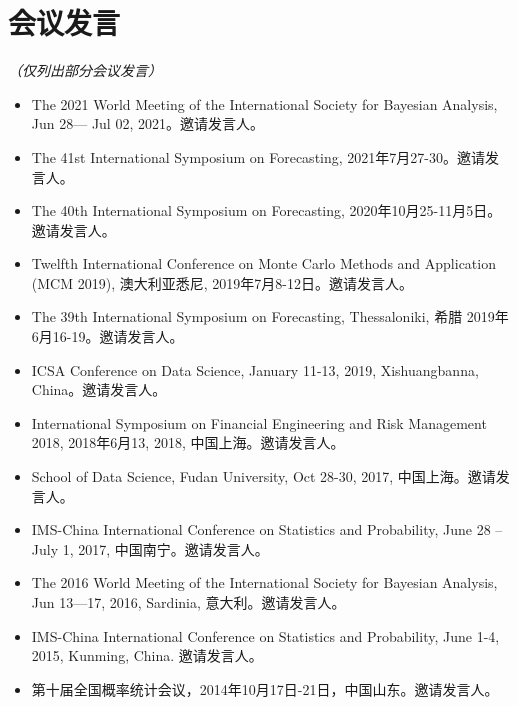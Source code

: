\documentclass[twoside,a4paper,11pt]{article}
\begin{document}
\section*{会议发言}

\emph{（仅列出部分会议发言）}

\begin{itemize}

\item The 2021 World Meeting of the International Society for Bayesian Analysis, Jun
  28— Jul 02, 2021。邀请发言人。

\item The 41st International Symposium on Forecasting, 2021年7月27-30。邀请发言人。

\item The 40th International Symposium on Forecasting,  2020年10月25-11月5日。邀请发言人。

\item Twelfth International Conference on Monte Carlo Methods and Application (MCM 2019),
  澳大利亚悉尼, 2019年7月8-12日。邀请发言人。

\item The 39th International Symposium on Forecasting, Thessaloniki, 希腊 2019年6月16-19。邀请发言人。

\item ICSA Conference on Data Science, January 11-13, 2019, Xishuangbanna, China。邀请发言人。

\item International Symposium on Financial Engineering and Risk Management 2018, 2018年6月13,
  2018, 中国上海。邀请发言人。

\item School of Data Science, Fudan University, Oct 28-30, 2017, 中国上海。邀请发言人。

\item IMS-China International Conference on Statistics and Probability, June 28 – July 1,
  2017, 中国南宁。邀请发言人。


\item The 2016 World Meeting of the International Society for Bayesian Analysis, Jun
  13—17, 2016, Sardinia, 意大利。邀请发言人。

\item IMS-China International Conference on Statistics and Probability, June 1-4, 2015,
  Kunming, China. 邀请发言人。

\item 第十届全国概率统计会议，2014年10月17日-21日，中国山东。邀请发言人。


\end{itemize}
\end{document}
